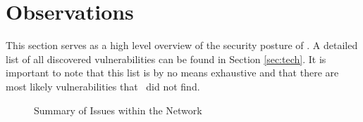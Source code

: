 \section{Observations}
This section serves as a high level overview of the security posture of \cptc. A detailed list of all discovered vulnerabilities can be found in Section \ref{sec:tech}. It is important to note that this list is by no means exhaustive and that there are most likely vulnerabilities that \teamname\ did not find.

\begin{figure}[h]
    \centering
    \caption{Summary of Issues within the Network}
\end{figure}


